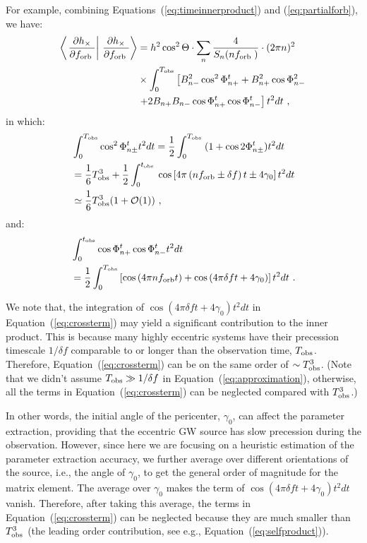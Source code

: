 \documentclass[%
 reprint,
 amsmath,amssymb,
 aps,
]{revtex4-2}
\begin{document}
For example, combining Equations~(\ref{eq:timeinnerproduct}) and (\ref{eq:partialforb}), we have:
\begin{align}
 \left\langle\left.\frac{\partial h_\times}{\partial f_{\text {orb }}} \right\rvert\, \frac{\partial h_\times}{\partial f_{\text {orb }}}\right\rangle & =h^2 \cos ^2 \Theta \cdot \sum_n \frac{4}{S_n(nf_{\text {orb }})} \cdot(2 \pi n)^2 \nonumber\\ 
& \times\int_0^{T_{\rm obs}}\left[B_{n-}^{2} \cos ^2 \Phi_{{n+}}^t+B_{n+}^{2} \cos \Phi_{{n-}}^2\right. \nonumber\\
& \left.+2 B_{n+} B_{n-}\cos \Phi_{{n+}}^t \cos \Phi_{n-}^t\right] t^2 d t \ ,\label{eq:time_inner_partial}
\end{align}
in which:
\begin{align}
& \int_0^{T_{\rm obs}} \cos ^2 \Phi_{n\pm}^t t^2 d t =\frac{1}{2}\int_0^{T_{\text {obs }}} (1+\cos  2\Phi_{n\pm}^t) t^2 d t \nonumber\\
& =\frac{1}{6} T_{\rm obs}^3+\frac{1}{2}\int_0^{t_{\text {obs }}} \cos \left[4 \pi\left(n f_{\rm orb} \pm \delta f\right) t \pm 4 \gamma_0\right] t^2 d t \nonumber\\
& \simeq \frac{1}{6} T_{\rm obs}^3(1+\mathcal{O}(1))\ ,\label{eq:selfproduct}
\end{align}
and:
\begin{align}
& \int_0^{t_{\rm obs }} \cos \Phi_{n+}^t \cos \Phi_{{n-}}^t t^2 d t \label{eq:crossterm}\\
&=\frac{1}{2} \int_0^{T_{\rm obs}}\left[\cos \left(4 \pi n f_{\rm orb} t\right)+\cos \left(4 \pi \delta f t+4 \gamma_0\right)\right] t^2 dt\ . \nonumber
\end{align}

We note that, the integration of $\cos \left(4 \pi \delta f t+4 \gamma_0\right) t^2 dt$ in Equation~(\ref{eq:crossterm}) may yield a significant contribution to the inner product. This is because many highly eccentric systems have their precession timescale $1/\delta f$ comparable to or longer than the observation time, $T_{\rm obs}$. Therefore, Equation~(\ref{eq:crossterm}) can be on the same order of $\sim T_{\rm obs}^3$. (Note that we didn't assume $T_{\rm obs}\gg 1/\delta f$ in Equation~(\ref{eq:approximation}), otherwise, all the terms in Equation~(\ref{eq:crossterm}) can be neglected compared with $T_{\rm obs}^3$.)

In other words, the initial angle of the pericenter, $\gamma_0$, can affect the parameter extraction, providing that the eccentric GW source has slow precession during the observation. However, since here we are focusing on a heuristic estimation of the parameter extraction accuracy, we further average over different orientations of the source, i.e., the angle of $\gamma_0$, to get the general order of magnitude for the matrix element. The average over $\gamma_0$ makes the term of $\cos \left(4 \pi \delta f t+4 \gamma_0\right) t^2 dt$ vanish. Therefore, after taking this average, the terms in Equation~(\ref{eq:crossterm}) can be neglected because they are much smaller than $T_{\rm obs}^3$ (the leading order contribution, see e.g., Equation~(\ref{eq:selfproduct})). 
\end{document}
